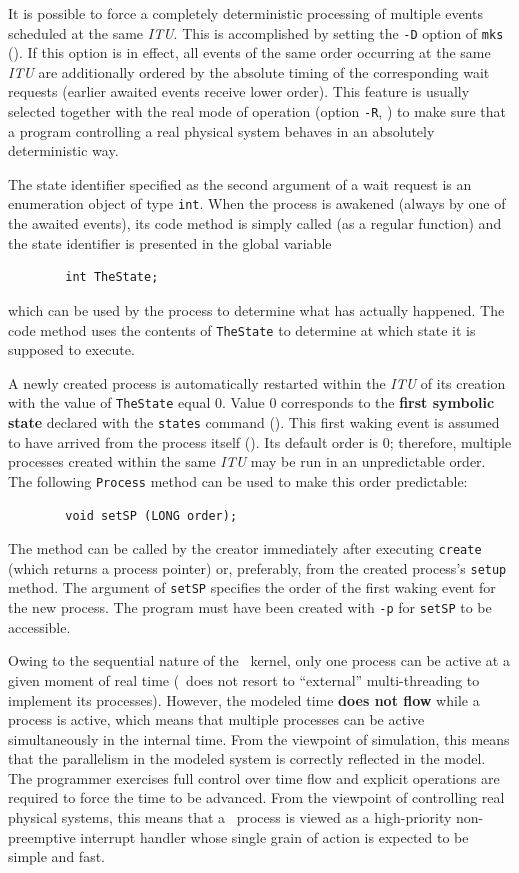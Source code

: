 \medskip

It is possible to force a completely deterministic processing of multiple events
scheduled at the same {\em ITU}.
This is accomplished by setting the {\tt -D} option of {\tt mks}
().
If this option is in effect, all events of the same order occurring at the
same {\em ITU\/}
are additionally ordered by the absolute timing of the corresponding
wait requests (earlier awaited events receive lower order).
This feature is usually selected together with the real mode of operation
(option {\tt -R}, )
to make sure that a program controlling a real physical
system behaves in an absolutely deterministic way.

The state identifier specified as the second argument of a wait
request is an enumeration object of type {\tt int}.
When the process is awakened (always by one of the awaited events), its
code method is simply called (as a regular function) and the
state identifier is presented in the global variable
\begin{verbatim}
        int TheState;
\end{verbatim}
which can be used by the process to determine what has actually happened.
The code method uses the contents of {\tt TheState} to determine at which
state it is supposed to execute.

A newly created process is automatically restarted within the {\em ITU\/}
of its creation with the value of {\tt TheState} equal 0.
Value 0 corresponds to the {\bf first symbolic state} declared with the
{\tt states} command ().
This first waking event is assumed to have arrived from the process itself
().
Its default order is 0; therefore,
multiple processes created within the same {\em ITU\/} may be
run in an unpredictable order.
The following {\tt Process} method can be used to make this order
predictable:
\begin{verbatim}
        void setSP (LONG order);
\end{verbatim}
The method can be called by the creator immediately after executing
{\tt create} (which returns a process pointer) or, preferably, from
the created process's {\tt setup} method.
The argument of {\tt setSP} specifies the order of the first waking event
for the new process.
The program must have been created with 
{\tt -p} for {\tt setSP} to be accessible.

Owing to the sequential nature of the \smurph\ kernel, only one process
can be active at a given moment of real time (\smurph\ does not resort
to ``external'' multi-threading to implement its processes).
However, the modeled time {\bf does not flow} while a process is active,
which means that multiple
processes can be active simultaneously in the internal time.
From the viewpoint of simulation, this means that the parallelism in the
modeled system is correctly reflected in the model.
The programmer exercises full control over time flow and
explicit operations are required to force the time to be advanced.
From the viewpoint of controlling real physical systems, this means that
a \smurph\ process is viewed as a high-priority non-preemptive
interrupt handler whose single grain of action is expected to be simple and
fast.

